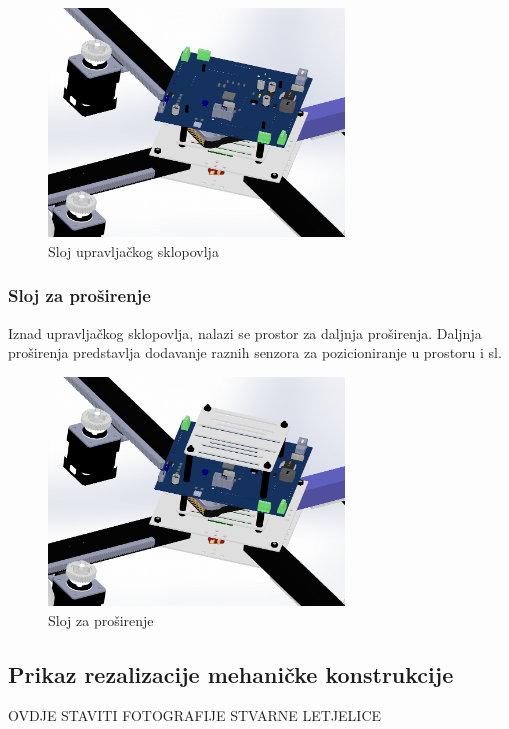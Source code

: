 \documentclass[11pt,a4paper]{article}
\begin{document}
\begin{figure}[H]
	\centering
	\includegraphics[width=0.7\textwidth]{figures/arducopter_slot_pcb.png}
	\caption{Sloj upravljačkog sklopovlja}
	\label{fig:slot_pcb}
\end{figure}

\subsubsection{Sloj za proširenje}
Iznad upravljačkog sklopovlja, nalazi se prostor za daljnja proširenja. Daljnja proširenja predstavlja dodavanje raznih senzora za pozicioniranje u prostoru i sl. 

\begin{figure}[H]
	\centering
	\includegraphics[width=0.7\textwidth]{figures/arducopter_slot_top.png}
	\caption{Sloj za proširenje}
	\label{fig:slot_top}
\end{figure}

\subsection{Prikaz rezalizacije mehaničke konstrukcije}
OVDJE STAVITI FOTOGRAFIJE STVARNE LETJELICE
\end{document}
